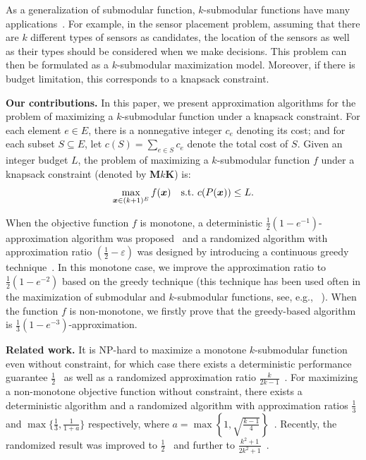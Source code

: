\documentclass[preprint,12pt]{elsarticle}
\def\bx{\boldsymbol{x}}
\def\tM{\textbf{M$k$K}}
\begin{document}
As a generalization of submodular function, $k$-submodular functions have many applications~\cite{EN2022,AV,TN}.
For example, in the sensor placement problem, assuming that there are $k$ different types of sensors as candidates, the location of the sensors as well as their types should be considered when we make decisions.
This problem can then be formulated as a $k$-submodular maximization model.
Moreover, if there is budget limitation, this corresponds to a knapsack constraint.

\textbf{Our contributions.}
In this paper, we present approximation algorithms for the problem of maximizing a $k$-submodular function under a knapsack constraint.
For each element $e\in E$, there is a nonnegative integer $c_e$ denoting its cost; and for each subset $S\subseteq E$, let $c(S)=\sum_{e\in S}c_e$ denote the total cost of $S$.
Given an integer budget $L$, the problem of maximizing a $k$-submodular function $f$ under a knapsack constraint (denoted by \tM) is:
\[
\max_{\bx\in(k+1)^E} f(\bx) \quad {\rm s. t.} \ c(P(\bx))\le L.
\]

When the objective function $f$ is monotone, a deterministic  $\frac{1}{2}(1-e^{-1})$-approximation algorithm was proposed~\cite{TWC} and a randomized algorithm with approximation ratio  $(\frac{1}{2}-\varepsilon)$ was designed by introducing a continuous greedy technique~\cite{WZ2017}. In this monotone case,
we improve the approximation ratio to $\frac{1}{2}(1-e^{-2})$ based on the greedy technique (this technique has been used often in the maximization of submodular and $k$-submodular functions, see, e.g., ~\cite{M,TWC}).
When the function $f$ is non-monotone, we firstly prove that the greedy-based algorithm is $\frac{1}{3}(1-e^{-3})$-approximation.

\textbf{Related work.}
It is NP-hard to maximize a monotone $k$-submodular function even without constraint, for which case there exists a deterministic performance guarantee $\frac{1}{2}$~\cite{JS} as well as a randomized approximation ratio $\frac{k}{2k-1}$~\cite{ITY}. For maximizing a non-monotone objective function without constraint, there exists a deterministic algorithm and a randomized algorithm with approximation ratios $\frac{1}{3}$ and $\max\{\frac{1}{3}, \frac{1}{1+a}\}$ respectively, where $a=\max\left\{1, \sqrt{\frac{k-1}{4}}\right\}$~\cite{JS}. Recently, the randomized result was improved to $\frac{1}{2}$~\cite{ITY} and further to $\frac{k^2+1}{2k^2+1}$~\cite{H}.
\end{document}
